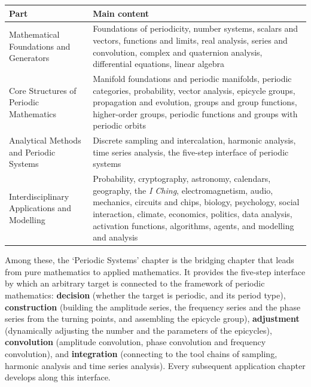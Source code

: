\begin{center}
\renewcommand{\arraystretch}{1.25}
\begin{tabularx}{\linewidth}{@{}>{\raggedright\arraybackslash\hspace{0pt}}p{4.2cm} >{\raggedright\arraybackslash\hspace{0pt}}X@{}}
\toprule
\textbf{Part} & \textbf{Main content} \\
\midrule
Mathematical Foundations and Generators & Foundations of periodicity, number systems, scalars and vectors, functions and limits, real analysis, series and convolution, complex and quaternion analysis, differential equations, linear algebra \\
Core Structures of Periodic Mathematics & Manifold foundations and periodic manifolds, periodic categories, probability, vector analysis, epicycle groups, propagation and evolution, groups and group functions, higher-order groups, periodic functions and groups with periodic orbits \\
Analytical Methods and Periodic Systems & Discrete sampling and intercalation, harmonic analysis, time series analysis, the five-step interface of periodic systems \\
Interdisciplinary Applications and Modelling & Probability, cryptography, astronomy, calendars, geography, the \emph{I Ching}, electromagnetism, audio, mechanics, circuits and chips, biology, psychology, social interaction, climate, economics, politics, data analysis, activation functions, algorithms, agents, and modelling and analysis \\
\bottomrule
\end{tabularx}
\end{center}

Among these, the `Periodic Systems' chapter is the bridging chapter that leads from pure mathematics to applied mathematics. It provides the five-step interface by which an arbitrary target is connected to the framework of periodic mathematics: \textbf{decision} (whether the target is periodic, and its period type), \textbf{construction} (building the amplitude series, the frequency series and the phase series from the turning points, and assembling the epicycle group), \textbf{adjustment} (dynamically adjusting the number and the parameters of the epicycles), \textbf{convolution} (amplitude convolution, phase convolution and frequency convolution), and \textbf{integration} (connecting to the tool chains of sampling, harmonic analysis and time series analysis). Every subsequent application chapter develops along this interface.


